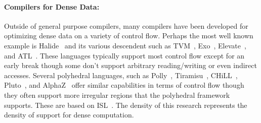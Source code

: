 \paragraph{Compilers for Dense Data:}
Outside of general purpose compilers, many compilers have been developed for optimizing dense data on a variety of control flow.
%
Perhaps the most well known example is Halide~\cite{ragan-kelley_halide_2013} and its various descendent such as TVM~\cite{chen2018tvm}, Exo~\cite{ikarashi2022exocompilation}, Elevate~\cite{hagedorn2020achieving}, and ATL~\cite{liu_verified_2022}.
%
These languages typically support most control flow except for an early break though some don't support arbitrary reading/writing or even indirect accesses.
%
Several polyhedral languages, such as Polly~\cite{grosser2012polly}, Tiramisu~\cite{baghdadi2019tiramisu}, CHiLL~\cite{chen2008framework}, Pluto~\cite{bondhugula2008pluto}, and AlphaZ~\cite{yuki2012alphaz} offer similar capabilities in terms of control flow though they often support more irregular regions that the polyhedral framework supports.
%
These are based on ISL~\cite{verdoolaege2010isl}.
%
The density of this research represents the density of support for dense computation.


